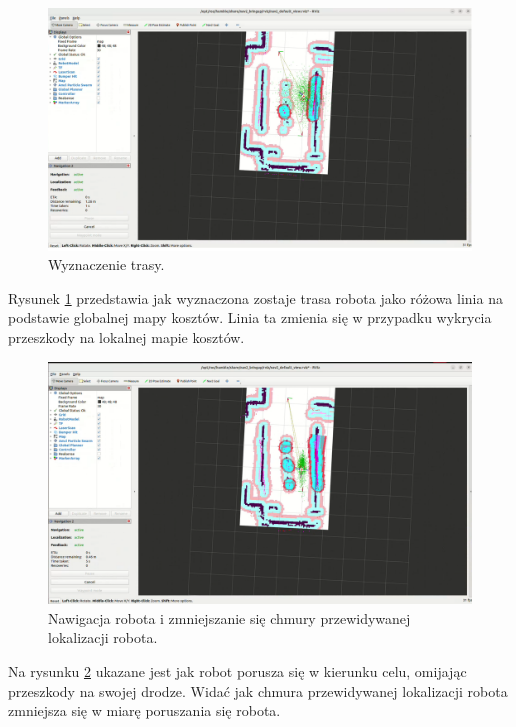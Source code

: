 \documentclass[a4paper,twoside,12pt]{book}
\begin{document}
\begin{figure}[!hb]
	\centering
	\includegraphics[width=1\textwidth]{images/launch-nav4.png}
	\caption{Wyznaczenie trasy.}
	\label{fig:nav-map4}
\end{figure}
\newline
Rysunek \ref{fig:nav-map4} przedstawia jak wyznaczona zostaje trasa robota jako różowa linia na podstawie globalnej mapy kosztów. Linia ta zmienia się w przypadku wykrycia przeszkody na lokalnej mapie kosztów.
\newpage
\begin{figure}[!hb]
	\centering
	\includegraphics[width=1\textwidth]{images/launch-nav5.png}
	\caption{Nawigacja robota i zmniejszanie się chmury przewidywanej lokalizacji robota.}
	\label{fig:nav-map5}
\end{figure}


Na rysunku \ref{fig:nav-map5} ukazane jest jak robot porusza się w kierunku celu, omijając przeszkody na swojej drodze. Widać jak chmura przewidywanej lokalizacji robota zmniejsza się w miarę poruszania się robota.
\end{document}
